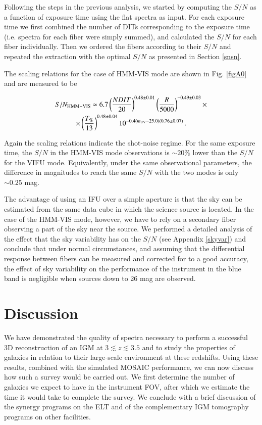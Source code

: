 \documentclass{aa}
\begin{document}
Following the steps in the previous analysis, we started by computing the $S/N$ as a function of exposure time using the flat spectra as input. For each exposure time we first combined the number of DITs corresponding to the exposure time (i.e. spectra for each fiber were simply summed), and calculated the $S/N$ for each fiber individually. Then we ordered the fibers according to their $S/N$ and repeated the extraction with the optimal $S/N$ as presented in Section \ref{snsn}.

The scaling relations for the case of HMM-VIS mode are shown in Fig. \ref{figA0} and are measured to be

\begin{multline}
\label{scalingHMM}
S/N_{\rm HMM-VIS} \approx 6.7\left(\frac{NDIT}{20}\right)^{0.48\pm 0.01}\left(\frac{R}{5000} \right)^{-0.49 \pm 0.03}\times \\ \times \left( \frac{T_{\%}}{13}\right)^{0.48\pm0.04}10^{-0.4(m_{\rm UV} - 25.0)(0.76 \pm 0.07)}\,.
\end{multline}

\noindent Again the scaling relations indicate the shot-noise regime. For the same exposure time, the $S/N$ in the HMM-VIS mode observations is $\sim 20 \%$ lower than the $S/N$ for the VIFU mode. Equivalently, under the same observational parameters, the difference in magnitudes to reach the same $S/N$ with the two modes is only $\sim 0.25$ mag. 

The advantage of using an IFU over a simple aperture is that the sky can be estimated from the same data cube in which the science source is located. In the case of the HMM-VIS mode, however, we have to rely on a secondary fiber observing a part of the sky near the source. We performed a detailed analysis of the effect that the sky variability has on the $S/N$ (see Appendix \ref{skyvar}) and conclude that under normal circumstances, and assuming that the differential response between fibers can be measured and corrected for to a good accuracy, the effect of sky variability on the performance of the instrument in the blue band is negligible when sources down to 26 mag are observed.

\section{Discussion}
\label{discuss}

We have demonstrated the quality of spectra necessary to perform a successful 3D reconstruction of an IGM at $3 \lesssim z \lesssim 3.5$ and to study the properties of galaxies in relation to their large-scale environment at these redshifts. Using these results, combined with the simulated MOSAIC performance, we can now discuss how such a survey would be carried out. We first determine the number of galaxies we expect to have in the instrument FOV, after which we estimate the time it would take to complete the survey. We conclude with a brief discussion of the synergy programs on the ELT and of the complementary IGM tomography programs on other facilities.
\end{document}
